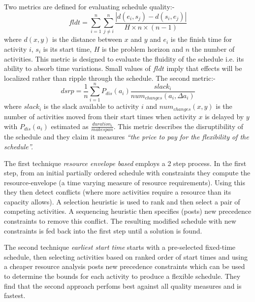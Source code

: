 Two metrics are defined for evaluating schedule quality:-
\begin{equation}
fldt = \sum_{i=1}^n \sum_{j \neq i}^n \frac { |d(e_i,s_j) - d(s_i, e_j)|}{ H \times n \times (n-1)}
\end{equation}
where $d(x,y)$ is the distance between $x$ and $y$ and $e_i$ is the finish time for activity $i$, $s_i$ is its start time, $H$ is the problem horizon and $n$ the number of activities. This metric is designed to evaluate the fluidity of the schedule i.e. its ability to absorb time variations. Small values of $fldt$ imply that effects will be localized rather than ripple through the schedule. The second metric:-
\begin{equation}
dsrp = \frac{1}{n}\sum_{i=1}^{n} P_{dis}(a_i) \frac{slack_i}{num_{changes}(a_i, \Delta a_i)}
\end{equation}
where $slack_i$ is the slack available to activity $i$ and $num_{changes}(x,y)$ is the number of activities moved from their start times when activity $x$ is delayed by $y$ with $P_{dis}(a_i)$ estimated as $\frac {duration_i}{makespan}$. This metric describes the disruptibility of the schedule and they claim it measures \emph{``the price to pay for the flexibility of the schedule''.}

The first technique \emph{resource envelope based} employs a 2 step process. 
In the first step, from an initial partially ordered schedule with constraints they compute the resource-envelope (a time varying measure of resource requirements). Using this they then detect conflicts (where more activities require a resource than its capacity allows). A selection heuristic is used to rank and then select a pair of competing activities. A sequencing heuristic then specifies (posts) new precedence constraints to remove this conflict. The resulting modified schedule with new constraints is fed back into the first step until a solution is found.

The second technique \emph{earliest start time} starts with a pre-selected fixed-time schedule, then selecting activities based on ranked order of start times and using a cheaper resource analysis posts new precedence constraints which can be used to determine the bounds for each activity to produce a flexible schedule. They find that the second approach perfoms best against all quality measures and is fastest.  


